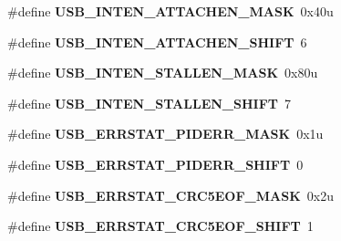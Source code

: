 \begin{DoxyCompactItemize}
\item 
\hypertarget{group___u_s_b___register___masks_gada08eb0b0c86565a19f43a0c9fbf293b}{}\#define {\bfseries U\+S\+B\+\_\+\+I\+N\+T\+E\+N\+\_\+\+A\+T\+T\+A\+C\+H\+E\+N\+\_\+\+M\+A\+S\+K}~0x40u\label{group___u_s_b___register___masks_gada08eb0b0c86565a19f43a0c9fbf293b}

\item 
\hypertarget{group___u_s_b___register___masks_ga2dcfada22ae8ed86992f14be6ab3f070}{}\#define {\bfseries U\+S\+B\+\_\+\+I\+N\+T\+E\+N\+\_\+\+A\+T\+T\+A\+C\+H\+E\+N\+\_\+\+S\+H\+I\+F\+T}~6\label{group___u_s_b___register___masks_ga2dcfada22ae8ed86992f14be6ab3f070}

\item 
\hypertarget{group___u_s_b___register___masks_ga18443f2f26840b47e4b4088d25f51c68}{}\#define {\bfseries U\+S\+B\+\_\+\+I\+N\+T\+E\+N\+\_\+\+S\+T\+A\+L\+L\+E\+N\+\_\+\+M\+A\+S\+K}~0x80u\label{group___u_s_b___register___masks_ga18443f2f26840b47e4b4088d25f51c68}

\item 
\hypertarget{group___u_s_b___register___masks_gac8b0e5912467cf86c8a2fcc3c1e98e24}{}\#define {\bfseries U\+S\+B\+\_\+\+I\+N\+T\+E\+N\+\_\+\+S\+T\+A\+L\+L\+E\+N\+\_\+\+S\+H\+I\+F\+T}~7\label{group___u_s_b___register___masks_gac8b0e5912467cf86c8a2fcc3c1e98e24}

\item 
\hypertarget{group___u_s_b___register___masks_gadf359cce923ca198235ecef76b5cc789}{}\#define {\bfseries U\+S\+B\+\_\+\+E\+R\+R\+S\+T\+A\+T\+\_\+\+P\+I\+D\+E\+R\+R\+\_\+\+M\+A\+S\+K}~0x1u\label{group___u_s_b___register___masks_gadf359cce923ca198235ecef76b5cc789}

\item 
\hypertarget{group___u_s_b___register___masks_gaf10f584ce9bbe8d7c0d0b8a6a4f61352}{}\#define {\bfseries U\+S\+B\+\_\+\+E\+R\+R\+S\+T\+A\+T\+\_\+\+P\+I\+D\+E\+R\+R\+\_\+\+S\+H\+I\+F\+T}~0\label{group___u_s_b___register___masks_gaf10f584ce9bbe8d7c0d0b8a6a4f61352}

\item 
\hypertarget{group___u_s_b___register___masks_ga400a9d616bd8457e1003d62d62660b5a}{}\#define {\bfseries U\+S\+B\+\_\+\+E\+R\+R\+S\+T\+A\+T\+\_\+\+C\+R\+C5\+E\+O\+F\+\_\+\+M\+A\+S\+K}~0x2u\label{group___u_s_b___register___masks_ga400a9d616bd8457e1003d62d62660b5a}

\item 
\hypertarget{group___u_s_b___register___masks_ga42e986ec54195657a22043422895c708}{}\#define {\bfseries U\+S\+B\+\_\+\+E\+R\+R\+S\+T\+A\+T\+\_\+\+C\+R\+C5\+E\+O\+F\+\_\+\+S\+H\+I\+F\+T}~1\label{group___u_s_b___register___masks_ga42e986ec54195657a22043422895c708}


\end{DoxyCompactItemize}
